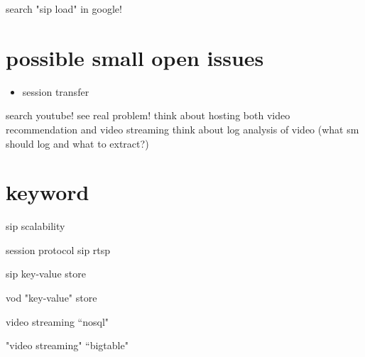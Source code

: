 \documentclass[•]{article}
\begin{document}
search "sip load" in google!




\section{possible small open issues}
\begin{itemize}
\item session transfer
\end{itemize}

search youtube! see real problem!
think about hosting both video recommendation and video streaming
think about log analysis of video (what sm should log and what to extract?)



\section{keyword}

sip scalability

session protocol sip rtsp

sip key-value store

vod "key-value" store

video streaming “nosql"

"video streaming" “bigtable"




\end{document}
